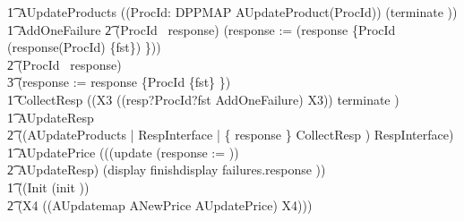 \begin{circus}
        \t1 AUpdateProducts \circdef ((\Interleave ProcId: DPPMAP  \circspot AUpdateProduct(ProcId)) \circseq (terminate \then \Skip)) \\

    \t1 AddOneFailure \circdef
        \t2 \lcircguard (ProcId \in \dom~response) \rcircguard \circguard (response := (response \oplus \{ProcId \mapsto (response(ProcId) \cup \{fst\}) \}))
						\extchoice \\
        \t2 \lcircguard(ProcId \notin \dom~response) \rcircguard \circguard \\
            \t3 (response := response \cup \{ProcId \mapsto \{fst\} \})\\

        \t1 CollectResp \circdef ((\circmu X3 \circspot ((resp?ProcId?fst \then  AddOneFailure) \circseq X3)) \extchoice terminate \then \Skip) \\

        \t1 AUpdateResp \circdef \\
        \t2 ((AUpdateProducts \lpar \emptyset | RespInterface | \{ response \} \rpar CollectResp )  \circhide RespInterface) \\

        \t1 AUpdatePrice \circdef (((update \then (response := \emptyset)) \circseq \\
            \t2 AUpdateResp) \circseq (display \then finishdisplay \then failures.response \then \Skip)) \\

	\t1 \circspot  ((Init \circseq (init \then \Skip)) \circseq \\
    \t2 (\circmu X4 \circspot ((AUpdatemap \extchoice ANewPrice \extchoice AUpdatePrice) \circseq X4))) \\
	\circend
\end{circus}

